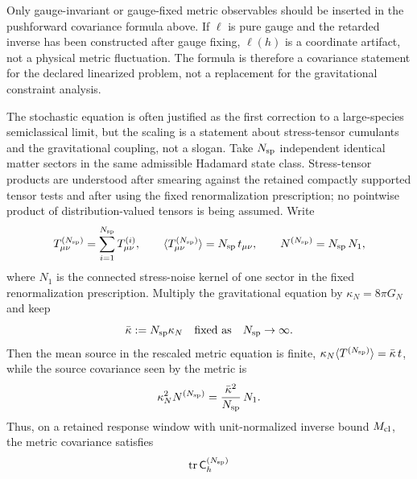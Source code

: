 Only gauge-invariant or gauge-fixed metric observables should be inserted in
the pushforward covariance formula above.  If
\(\ell\) is pure gauge and the retarded inverse has been constructed after
gauge fixing, \(\ell(h)\) is a coordinate artifact, not a physical metric
fluctuation.  The formula is therefore a covariance statement for the declared
linearized problem, not a replacement for the gravitational constraint
analysis.

\begin{controlledapproximation}
\label{ca:semiclassical-large-n-scaling-window}
The stochastic equation is often justified as the first correction to a
large-species semiclassical limit, but the scaling is a statement about
stress-tensor cumulants and the gravitational coupling, not a slogan.  Take
\(N_{\rm sp}\) independent identical matter sectors in the same admissible
Hadamard state class.  Stress-tensor products are understood after smearing
against the retained compactly supported tensor tests and after using the fixed
renormalization prescription; no pointwise product of distribution-valued
tensors is being assumed.  Write
\begin{equation}
  T_{\mu\nu}^{(N_{\rm sp})}
  =
  \sum_{i=1}^{N_{\rm sp}}T_{\mu\nu}^{(i)},
  \qquad
  \langle T_{\mu\nu}^{(N_{\rm sp})}\rangle
  =
  N_{\rm sp}\,t_{\mu\nu},
  \qquad
  N^{(N_{\rm sp})}
  =
  N_{\rm sp}\,N_1 ,
  \label{eq:semiclassical-large-n-stress-noise}
\end{equation}
where \(N_1\) is the connected stress-noise kernel of one sector in the fixed
renormalization prescription.  Multiply the gravitational equation by
\(\kappa_N=8\pi G_N\) and keep
\begin{equation}
  \bar\kappa
  :=
  N_{\rm sp}\kappa_N
  \quad\text{fixed as}\quad
  N_{\rm sp}\to\infty .
  \label{eq:semiclassical-large-n-kappa-scaling}
\end{equation}
Then the mean source in the rescaled metric equation is finite,
\(\kappa_N\langle T^{(N_{\rm sp})}\rangle=\bar\kappa\,t\), while the source
covariance seen by the metric is
\begin{equation}
  \kappa_N^2 N^{(N_{\rm sp})}
  =
  \frac{\bar\kappa^2}{N_{\rm sp}}\,N_1 .
  \label{eq:semiclassical-large-n-source-noise}
\end{equation}
Thus, on a retained response window with unit-normalized inverse bound
\(M_{\rm cl}\), the metric covariance satisfies
\begin{equation}
  \operatorname{tr}\mathsf C_h^{(N_{\rm sp})}

\end{equation}
\end{controlledapproximation}
